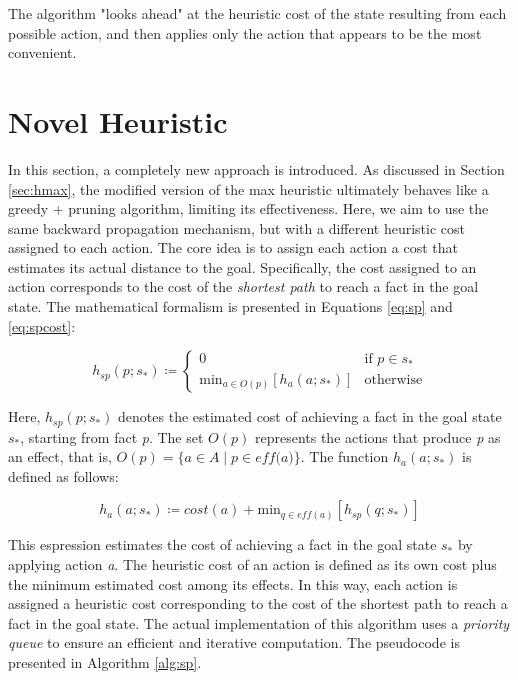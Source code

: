 The algorithm "looks ahead" at the heuristic cost of the state resulting from each possible action,
and then applies only the action that appears to be the most convenient.

\section{Novel Heuristic}
\label{sec:shortestpath}
In this section, a completely new approach is introduced. As discussed in Section \ref{sec:hmax},
the modified version of the max heuristic ultimately behaves like a greedy + pruning algorithm, limiting its effectiveness.
Here, we aim to use the same backward propagation mechanism, but with a different heuristic cost assigned to each action.
The core idea is to assign each action a cost that estimates its actual distance to the goal.
Specifically, the cost assigned to an action corresponds to the cost of the \textit{shortest path} to reach a fact in the goal state.
The mathematical formalism is presented in Equations \ref{eq:sp} and \ref{eq:spcost}:

\begin{equation}
	\label{eq:sp}
	h_{sp}\left(p;s_*\right) \coloneqq \begin{cases}
		0                                                                    & \text{if $p \in s_*$} \\
		\text{min}_{a \in O\left(p\right)}\left[h_a\left(a;s_*\right)\right] & \text{otherwise}
	\end{cases}
\end{equation}

Here, $h_{sp}\left(p;s_*\right)$ denotes the estimated cost of achieving a fact in the goal state $s_*$, starting from
fact \textit{p}. The set $O\left(p\right)$ represents the actions that produce \textit{p} as an effect,
that is, $O\left(p\right) = \{a \in A \mid p \in \textit{eff(a)}\}$. The function $h_a\left(a;s_*\right)$ is
defined as follows:

\begin{equation}
	\label{eq:spcost}
	h_a\left(a;s_*\right) \coloneqq cost(a) + \text{min}_{q \in \textit{eff}\left(a\right)} \left[h_{sp}\left(q;s_*\right)\right]
\end{equation}

This espression estimates the cost of achieving a fact in the goal state $s_*$ by applying
action \textit{a}. The heuristic cost of an action is defined as its own cost plus the minimum estimated cost among its effects.
In this way, each action is assigned a heuristic cost corresponding to the cost of the shortest path to reach
a fact in the goal state.
The actual implementation of this algorithm uses a \textit{priority queue} to ensure an
efficient and iterative computation. The pseudocode is presented in Algorithm \ref{alg:sp}.

